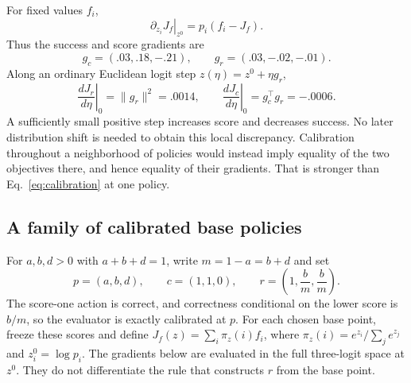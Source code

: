 \documentclass[11pt]{article}
\begin{document}
For fixed values $f_i$,
\begin{equation}
\left.\partial_{z_i}J_f\right|_{z^0}=p_i(f_i-J_f).
\label{eq:logit}
\end{equation}
Thus the success and score gradients are
\begin{equation}
g_c=(.03,.18,-.21),\qquad g_r=(.03,-.02,-.01).
\label{eq:gcgr}
\end{equation}
Along an ordinary Euclidean logit step $z(\eta)=z^0+\eta g_r$,
\begin{equation}
\left.\frac{dJ_r}{d\eta}\right|_0=\lVert g_r\rVert^2=.0014,
\qquad
\left.\frac{dJ_c}{d\eta}\right|_0=g_c^\top g_r=-.0006.
\label{eq:local}
\end{equation}
A sufficiently small positive step increases score and decreases success. No later distribution shift is needed to obtain this local discrepancy. Calibration throughout a neighborhood of policies would instead imply equality of the two objectives there, and hence equality of their gradients. That is stronger than Eq.~\eqref{eq:calibration} at one policy.

\subsection{A family of calibrated base policies}
\label{sec:calibration_family}
For $a,b,d>0$ with $a+b+d=1$, write $m=1-a=b+d$ and set
\begin{equation}
 p=(a,b,d),\qquad c=(1,1,0),\qquad
 r=\left(1,\frac{b}{m},\frac{b}{m}\right).
 \label{eq:family_setup}
\end{equation}
The score-one action is correct, and correctness conditional on the lower
score is $b/m$, so the evaluator is exactly calibrated at $p$.
For each chosen base point, freeze these scores and define
$J_f(z)=\sum_i\pi_z(i)f_i$, where
$\pi_z(i)=e^{z_i}/\sum_j e^{z_j}$ and $z_i^0=\log p_i$.
The gradients below are evaluated in the full three-logit space at $z^0$.
They do not differentiate the rule that constructs $r$ from the base point.
\end{document}
